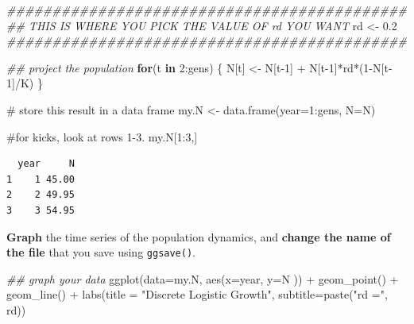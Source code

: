 \documentclass[
  letterpaper,
  DIV=11,
  numbers=noendperiod]{scrreprt}
\newenvironment{Shaded}{\begin{snugshade}}{\end{snugshade}}
\newcommand{\AttributeTok}[1]{\textcolor[rgb]{0.40,0.45,0.13}{#1}}
\newcommand{\CommentTok}[1]{\textcolor[rgb]{0.37,0.37,0.37}{#1}}
\newcommand{\ControlFlowTok}[1]{\textcolor[rgb]{0.00,0.23,0.31}{\textbf{#1}}}
\newcommand{\DecValTok}[1]{\textcolor[rgb]{0.68,0.00,0.00}{#1}}
\newcommand{\DocumentationTok}[1]{\textcolor[rgb]{0.37,0.37,0.37}{\textit{#1}}}
\newcommand{\FloatTok}[1]{\textcolor[rgb]{0.68,0.00,0.00}{#1}}
\newcommand{\FunctionTok}[1]{\textcolor[rgb]{0.28,0.35,0.67}{#1}}
\newcommand{\NormalTok}[1]{\textcolor[rgb]{0.00,0.23,0.31}{#1}}
\newcommand{\OtherTok}[1]{\textcolor[rgb]{0.00,0.23,0.31}{#1}}
\newcommand{\SpecialCharTok}[1]{\textcolor[rgb]{0.37,0.37,0.37}{#1}}
\newcommand{\StringTok}[1]{\textcolor[rgb]{0.13,0.47,0.30}{#1}}
\begin{document}
\begin{Shaded}
\begin{Highlighting}[]
\DocumentationTok{\#\#\#\#\#\#\#\#\#\#\#\#\#\#\#\#\#\#\#\#\#\#\#\#\#\#\#\#\#\#\#\#\#\#\#\#\#\#\#\#\#\#\#\#}
\DocumentationTok{\#\# THIS IS WHERE YOU PICK THE VALUE OF rd YOU WANT}
\NormalTok{rd }\OtherTok{\textless{}{-}} \FloatTok{0.2}
\DocumentationTok{\#\#\#\#\#\#\#\#\#\#\#\#\#\#\#\#\#\#\#\#\#\#\#\#\#\#\#\#\#\#\#\#\#\#\#\#\#\#\#\#\#\#\#\#}


\DocumentationTok{\#\# project the population}
\ControlFlowTok{for}\NormalTok{(t }\ControlFlowTok{in} \DecValTok{2}\SpecialCharTok{:}\NormalTok{gens) \{ }
\NormalTok{  N[t] }\OtherTok{\textless{}{-}}\NormalTok{ N[t}\DecValTok{{-}1}\NormalTok{] }\SpecialCharTok{+}\NormalTok{ N[t}\DecValTok{{-}1}\NormalTok{]}\SpecialCharTok{*}\NormalTok{rd}\SpecialCharTok{*}\NormalTok{(}\DecValTok{1}\SpecialCharTok{{-}}\NormalTok{N[t}\DecValTok{{-}1}\NormalTok{]}\SpecialCharTok{/}\NormalTok{K) }
\NormalTok{\}}

\CommentTok{\# store this result in a data frame}
\NormalTok{my.N }\OtherTok{\textless{}{-}} \FunctionTok{data.frame}\NormalTok{(}\AttributeTok{year=}\DecValTok{1}\SpecialCharTok{:}\NormalTok{gens, }\AttributeTok{N=}\NormalTok{N)}

\CommentTok{\#for kicks, look at rows 1{-}3.}
\NormalTok{my.N[}\DecValTok{1}\SpecialCharTok{:}\DecValTok{3}\NormalTok{,]}
\end{Highlighting}
\end{Shaded}

\begin{verbatim}
  year     N
1    1 45.00
2    2 49.95
3    3 54.95
\end{verbatim}

\textbf{Graph} the time series of the population dynamics, and
\textbf{change the name of the file} that you save using
\texttt{ggsave()}.

\begin{Shaded}
\begin{Highlighting}[]
\DocumentationTok{\#\# graph your data}
\FunctionTok{ggplot}\NormalTok{(}\AttributeTok{data=}\NormalTok{my.N, }\FunctionTok{aes}\NormalTok{(}\AttributeTok{x=}\NormalTok{year, }\AttributeTok{y=}\NormalTok{N )) }\SpecialCharTok{+} 
  \FunctionTok{geom\_point}\NormalTok{() }\SpecialCharTok{+} 
  \FunctionTok{geom\_line}\NormalTok{() }\SpecialCharTok{+}
  \FunctionTok{labs}\NormalTok{(}\AttributeTok{title =} \StringTok{"Discrete Logistic Growth"}\NormalTok{,}
       \AttributeTok{subtitle=}\FunctionTok{paste}\NormalTok{(}\StringTok{"rd ="}\NormalTok{, rd))}
\end{Highlighting}
\end{Shaded}
\end{document}
